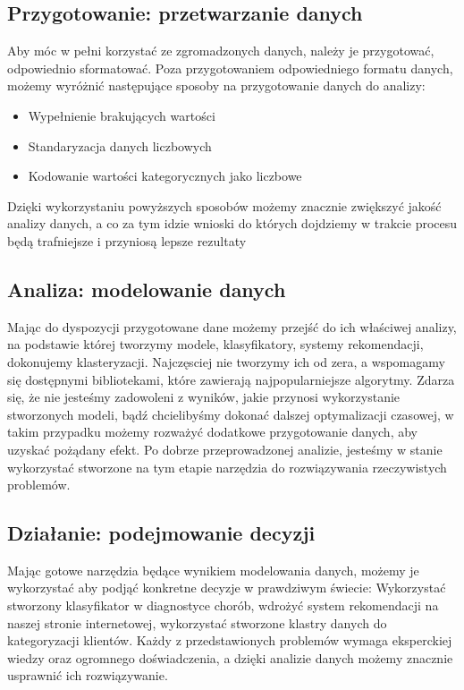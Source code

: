 \documentclass{book}
\begin{document}
\subsection{Przygotowanie: przetwarzanie danych}
Aby móc w pełni korzystać ze zgromadzonych danych, 
należy je przygotować, odpowiednio sformatować. 
Poza przygotowaniem odpowiedniego formatu danych, 
możemy wyróżnić następujące sposoby na przygotowanie danych do analizy:
\begin{itemize}
    \item Wypełnienie brakujących wartości 
    \item Standaryzacja danych liczbowych
    \item Kodowanie wartości kategorycznych jako liczbowe
  \end{itemize}
Dzięki wykorzystaniu powyższych sposobów możemy znacznie zwiększyć jakość analizy danych, 
a co za tym idzie wnioski do których dojdziemy w trakcie procesu będą 
trafniejsze i przyniosą lepsze rezultaty


\subsection{Analiza: modelowanie danych}
Mając do dyspozycji przygotowane dane możemy przejść do ich właściwej analizy, 
na podstawie której tworzymy modele, klasyfikatory, systemy rekomendacji, dokonujemy klasteryzacji. 
Najczęsciej nie tworzymy ich od zera, a wspomagamy się dostępnymi bibliotekami, które zawierają 
najpopularniejsze algorytmy. Zdarza się, że nie jesteśmy zadowoleni z wyników, jakie przynosi 
wykorzystanie stworzonych modeli, bądź chcielibyśmy dokonać dalszej optymalizacji czasowej, 
w takim przypadku możemy rozważyć dodatkowe przygotowanie danych, aby uzyskać pożądany efekt.
Po dobrze przeprowadzonej analizie, jesteśmy w stanie 
wykorzystać stworzone na tym etapie narzędzia do rozwiązywania rzeczywistych problemów.

\subsection{Działanie: podejmowanie decyzji}
Mając gotowe narzędzia będące wynikiem modelowania danych, możemy je wykorzystać aby podjąć 
konkretne decyzje w prawdziwym świecie: Wykorzystać stworzony 
klasyfikator w diagnostyce chorób, wdrożyć system rekomendacji 
na naszej stronie internetowej, wykorzystać stworzone klastry danych do kategoryzacji klientów. 
Każdy z przedstawionych problemów wymaga eksperckiej wiedzy oraz ogromnego doświadczenia, 
a dzięki analizie danych możemy znacznie usprawnić ich rozwiązywanie.
\end{document}
